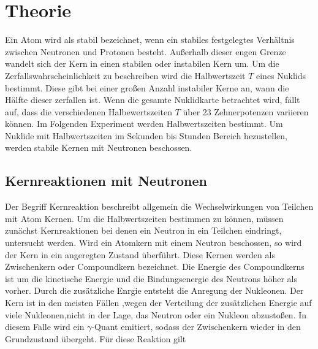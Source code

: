 \section{Theorie}
\label{sec:theorie}

Ein Atom wird als stabil bezeichnet, wenn ein stabiles festgelegtes Verhältnis zwischen Neutronen und Protonen besteht.
Außerhalb dieser engen Grenze wandelt sich der Kern in einen stabilen oder instabilen Kern um.
Um die Zerfallswahrscheinlichkeit zu beschreiben wird die Halbwertszeit $T$ eines Nuklids bestimmt. Diese gibt bei einer 
großen Anzahl instabiler Kerne an, wann die Hälfte dieser zerfallen ist. Wenn die gesamte Nuklidkarte betrachtet wird, fällt auf, dass 
die verschiedenen Halbewertszeiten $T$ über 23 Zehnerpotenzen variieren können.
Im Folgenden Experiment werden Halbwertszeiten bestimmt. Um Nuklide mit Halbwertszeiten im Sekunden bis Stunden Bereich hezustellen,
werden stabile Kernen mit Neutronen beschossen.

\subsection{Kernreaktionen mit Neutronen}
\label{sec:Kernreaktionen mit Neutronen}

Der Begriff Kernreaktion beschreibt allgemein die Wechselwirkungen von Teilchen mit Atom Kernen.
Um die Halbwertszeiten bestimmen zu können, müssen zunächst Kernreaktionen bei denen ein Neutron in ein Teilchen
eindringt, untersucht werden. Wird ein Atomkern mit einem Neutron beschossen, so wird der Kern in ein angeregten Zustand überführt.
Diese Kernen werden als Zwischenkern oder Compoundkern bezeichnet.
Die Energie des Compoundkerns ist um die kinetische Energie und die Bindungsenergie des Neutrons höher als
vorher. Durch die zusätzliche Enrgie entsteht die Anregung der Nukleonen. Der Kern ist in den meisten Fällen ,wegen der
Verteilung der zusätzlichen Energie auf viele Nukleonen,nicht in der Lage, das Neutron oder ein Nukleon abzustoßen.
In diesem Falle wird ein $\gamma$-Quant emitiert, sodass der Zwischenkern wieder in den Grundzustand übergeht.
Für diese Reaktion gilt




